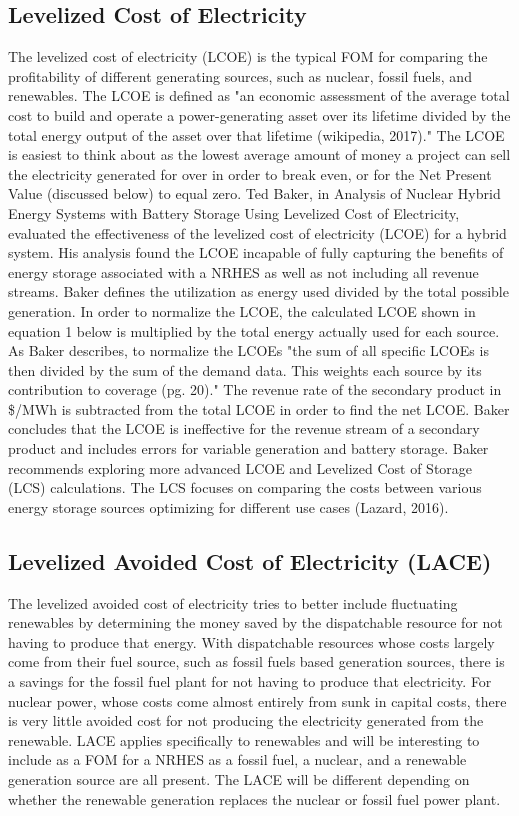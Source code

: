 \documentclass[12pt]{UIdahoMastersThesis}
\begin{document}
\subsection{Levelized Cost of Electricity}
The levelized cost of electricity (LCOE) is the typical FOM for comparing the profitability of different generating sources, such as nuclear, fossil fuels, and renewables. The LCOE is defined as "an economic assessment of the average total cost to build and operate a power-generating asset over its lifetime divided by the total energy output of the asset over that lifetime (wikipedia, 2017)." The LCOE is easiest to think about as the lowest average amount of money a project can sell the electricity generated for over in order to break even, or for the Net Present Value (discussed below) to equal zero. Ted Baker, in Analysis of  Nuclear Hybrid Energy Systems with Battery Storage Using Levelized Cost of Electricity, evaluated the effectiveness of the levelized cost of electricity (LCOE) for a hybrid system. His analysis found the LCOE incapable of fully capturing the benefits of energy storage associated with a NRHES as well as not including all revenue streams.  Baker defines the utilization as energy used divided by the total possible generation. In order to normalize the LCOE, the calculated LCOE shown in equation 1 below is multiplied by the total energy actually used for each source.  As Baker describes, to normalize the LCOEs "the sum of all specific LCOEs is then divided by the sum of the demand data. This weights each source by its contribution to coverage (pg. 20)."  The revenue rate of the secondary product in \$/MWh is subtracted from the total LCOE in order to find the net LCOE.  Baker concludes that the LCOE is ineffective for the revenue stream of a secondary product and includes errors for variable generation and battery storage. Baker recommends exploring more advanced LCOE and Levelized Cost of Storage (LCS) calculations. The LCS focuses on comparing the costs between various energy storage sources optimizing for different use cases (Lazard, 2016).

\subsection{Levelized Avoided Cost of Electricity (LACE)}
The levelized avoided cost of electricity tries to better include fluctuating renewables by determining the money saved by the dispatchable resource for not having to produce that energy. With dispatchable resources whose costs largely come from their fuel source, such as fossil fuels based generation sources, there is a savings for the fossil fuel plant for not having to produce that electricity.  For nuclear power, whose costs come almost entirely from sunk in capital costs, there is very little avoided cost for not producing the electricity generated from the renewable.  LACE applies specifically to renewables and will be interesting to include as a FOM for a NRHES as a fossil fuel, a nuclear, and a renewable generation source are all present. The LACE will be different depending on whether the renewable generation replaces the nuclear or fossil fuel power plant.  
\end{document}
